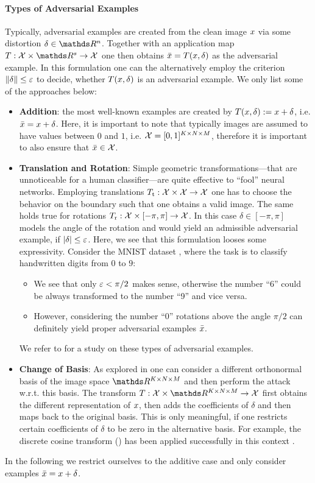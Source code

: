 \paragraph{Types of Adversarial Examples} Typically, adversarial examples are created from the clean image $x$ via some distortion $\delta\in\R^n$. Together with an application map $T:\Inp\times\R^s\to\Inp$ one then obtains $\bar{x}=T(x,\delta)$ as the adversarial example. In this formulation one can the alternatively employ the criterion $\left\|\delta\right\|\leq \varepsilon$ to decide, whether $T(x,\delta)$ is an adversarial example. We only list some of the approaches below:
%
\begin{itemize}
\item\textbf{Addition}: the most well-known examples are created by $T(x,\delta):=x+\delta$, i.e. $\bar{x} = x + \delta$. Here, it is important to note that typically images are assumed to have values between $0$ and $1$, i.e. $\mathcal{X}=[0,1]^{K\times N\times M}$, therefore it is important to also ensure that $\bar{x}\in\mathcal{X}$.
%
\item\textbf{Translation and Rotation}: Simple geometric transformations---that are unnoticeable for a human classifier---are quite effective to \enquote{fool} neural networks. Employing translations $T_{\text{t}}:\mathcal{X}\times\mathcal{X}\to\mathcal{X}$ one has to choose the behavior on the boundary such that one obtains a valid image. The same holds true for rotations $T_{\text{r}}:\mathcal{X}\times [-\pi,\pi]\to\mathcal{X}$. In this case $\delta\in[-\pi,\pi]$ models the angle of the rotation and would yield an admissible adversarial example, if $\left|\delta\right|\leq \varepsilon$. Here, we see that this formulation looses some expressivity. Consider the MNIST dataset \cite{leCun10}, where the task is to classify handwritten digits from $0$ to $9$:
%
\begin{itemize}
\item We see that only $\varepsilon<\pi/2$ makes sense, otherwise the number \enquote{6} could be always transformed to the number \enquote{9} and vice versa.
\item However, considering the number \enquote{0} rotations above the angle $\pi/2$ can definitely yield proper adversarial examples $\bar{x}$.
\end{itemize}
%
We refer to \cite{engstrom2018rotation} for a study on these types of adversarial examples.
%
\item\textbf{Change of Basis}: As explored in \cite{guo2017countering} one can consider a different orthonormal basis of the image space $\R^{K\times N\times M}$ and then perform the attack w.r.t. this basis. 
The transform $T:\Inp\times\R^{K\times N\times M}\to\Inp$ first obtains the different representation of $x$, then adds the coefficients of $\delta$ and then maps back to the original basis. This is only meaningful, if one restricts certain coefficients of $\delta$ to be zero in the alternative basis. For example, the discrete cosine transform (\cite{ahmed1974discrete}) has been applied successfully in this context \cite{guo2017countering}.
\end{itemize}
%
%
In the following we restrict ourselves to the additive case and only consider examples $\bar{x} = x + \delta$.
%
%

